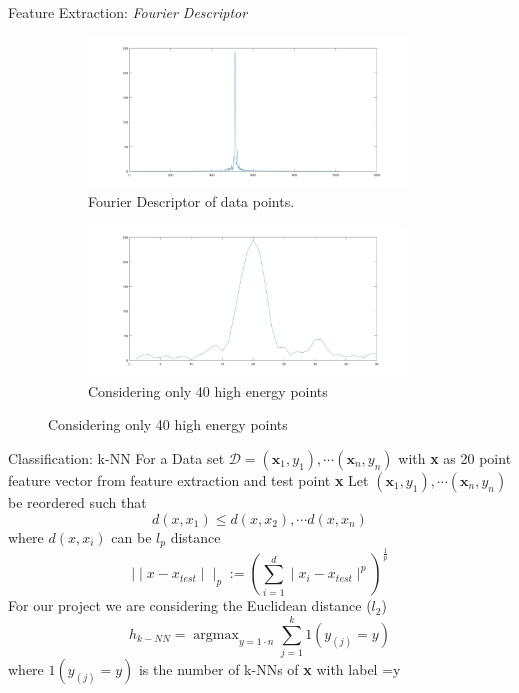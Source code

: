 \documentclass[10pt]{beamer}
\DeclareMathOperator*{\argmax}{argmax}
\begin{document}
\begin{frame}{Feature Extraction: \textit{Fourier Descriptor}}
\begin{figure}
    \centering
    \begin{subfigure}[b]{0.4\textwidth}
        \includegraphics[width=\textwidth,height = 4cm]{shifted_fft}
        \caption{Fourier Descriptor of data points.}
    \end{subfigure}
    \begin{subfigure}[b]{0.4\textwidth}
        \includegraphics[width=\textwidth,height = 4cm]{shifted_fft_trimmed}
        \caption{Considering only 40 high energy points}
    \end{subfigure}
\end{figure}
\end{frame}

\begin{frame}{Classification: k-NN}
For a Data set $\mathscr{D} = {(\textbf{x}_1,y_1), \cdots (\textbf{x}_n,y_n)}$  with \textbf{x} as 20 point feature vector from feature extraction and test point \textbf{x}
Let ${(\textbf{x}_1,y_1), \cdots (\textbf{x}_n,y_n)}$  be reordered such that
\begin{equation*}
d(x,x_1) \leq d(x,x_2),\cdots d(x,x_n)
\end{equation*}
where $d(x,x_i) $ can be $l_p$ distance
\begin{equation*}
	\mid \mid x - x_{test} \mid \mid_p := (\sum_{i=1}^d \mid x_i - x_{test} \mid^p)^\frac{1}{p}
\end{equation*}
For our project we are considering the Euclidean distance ($l_2$)
\begin{equation}
h_{k-NN}  = \argmax_{y= 1 \cdot n} \sum^{k}_{j=1} 1(y_{(j)} = y)
\end{equation}
where $1(y_{(j)} = y)$   is the number of k-NNs of \textbf{x} with label =y \cite{ishwarspring18}\\
\end{frame}
\end{document}
